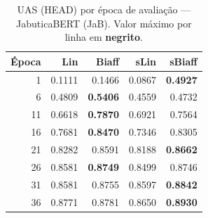 \clearpage
\begin{table}[p]
\centering
\caption{UAS (HEAD) por \'epoca de avalia\c{c}\~ao --- JabuticaBERT (JaB).
Valor m\'aximo por linha em \textbf{negrito}.}
\label{tab:instab-jab-head}
\begingroup
\small\setlength{\tabcolsep}{10pt}\renewcommand{\arraystretch}{1.2}%
\begin{tabular}{r r r r r}
\toprule
\textbf{\'Epoca} & \textbf{Lin} & \textbf{Biaff} & \textbf{sLin} & \textbf{sBiaff} \\
\midrule
   1 & 0.1111 & 0.1466 & 0.0867 & \textbf{0.4927} \\
   6 & 0.4809 & \textbf{0.5406} & 0.4559 & 0.4732 \\
  11 & 0.6618 & \textbf{0.7870} & 0.6921 & 0.7564 \\
  16 & 0.7681 & \textbf{0.8470} & 0.7346 & 0.8305 \\
  21 & 0.8282 & 0.8591 & 0.8188 & \textbf{0.8662} \\
  26 & 0.8581 & \textbf{0.8749} & 0.8499 & 0.8746 \\
  31 & 0.8581 & 0.8755 & 0.8597 & \textbf{0.8842} \\
  36 & 0.8771 & 0.8781 & 0.8650 & \textbf{0.8930} \\
\bottomrule
\end{tabular}
\endgroup
\instablegendaFull
\end{table}
